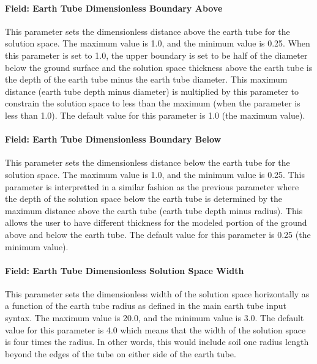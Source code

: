 \paragraph{Field: Earth Tube Dimensionless Boundary Above}\label{field-earth-tube-dimensionless-boundary-above}
This parameter sets the dimensionless distance above the earth tube for the solution space.  The maximum value is 1.0, and the minimum value is 0.25.  When this parameter is set to 1.0, the upper boundary is set to be half of the diameter below the ground surface and the solution space thickness above the earth tube is the depth of the earth tube minus the earth tube diameter.  This maximum distance (earth tube depth minus diameter) is multiplied by this parameter to constrain the solution space to less than the maximum (when the parameter is less than 1.0).    The default value for this parameter is 1.0 (the maximum value).

\paragraph{Field: Earth Tube Dimensionless Boundary Below}\label{field-earth-tube-dimensionless-boundary-below}
This parameter sets the dimensionless distance below the earth tube for the solution space.  The maximum value is 1.0, and the minimum value is 0.25.  This parameter is interpretted in a similar fashion as the previous parameter where the depth of the solution space below the earth tube is determined by the maximum distance above the earth tube (earth tube depth minus radius).  This allows the user to have different thickness for the modeled portion of the ground above and below the earth tube.  The default value for this parameter is 0.25 (the minimum value).

\paragraph{Field: Earth Tube Dimensionless Solution Space Width}\label{field-earth-tube-dimensionless-solution-space-width}
This parameter sets the dimensionless width of the solution space horizontally as a function of the earth tube radius as defined in the main earth tube input syntax.  The maximum value is 20.0, and the minimum value is 3.0.  The default value for this parameter is 4.0 which means that the width of the solution space is four times the radius.  In other words, this would include soil one radius length beyond the edges of the tube on either side of the earth tube.

